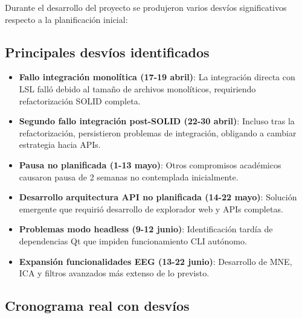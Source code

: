 Durante el desarrollo del proyecto se produjeron varios desvíos significativos respecto a la planificación inicial:

\subsection{Principales desvíos identificados}

\begin{itemize}
    \item \textbf{Fallo integración monolítica (17-19 abril)}: La integración directa con LSL falló debido al tamaño de archivos monolíticos, requiriendo refactorización SOLID completa.
    
    \item \textbf{Segundo fallo integración post-SOLID (22-30 abril)}: Incluso tras la refactorización, persistieron problemas de integración, obligando a cambiar estrategia hacia APIs.
    
    \item \textbf{Pausa no planificada (1-13 mayo)}: Otros compromisos académicos causaron pausa de 2 semanas no contemplada inicialmente.
    
    \item \textbf{Desarrollo arquitectura API no planificada (14-22 mayo)}: Solución emergente que requirió desarrollo de explorador web y APIs completas.
    
    \item \textbf{Problemas modo headless (9-12 junio)}: Identificación tardía de dependencias Qt que impiden funcionamiento CLI autónomo.
    
    \item \textbf{Expansión funcionalidades EEG (13-22 junio)}: Desarrollo de MNE, ICA y filtros avanzados más extenso de lo previsto.
\end{itemize}

\subsection{Cronograma real con desvíos}

